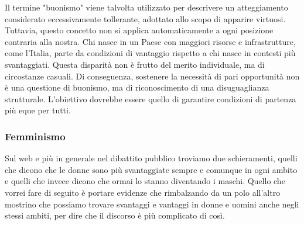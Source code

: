 \documentclass[12pt]{book} %
\begin{document}
\begin{mdframed}[linewidth=1pt]
Il termine "buonismo" viene talvolta utilizzato per descrivere un atteggiamento considerato eccessivamente tollerante, adottato allo scopo di apparire virtuosi. Tuttavia, questo concetto non si applica automaticamente a ogni posizione contraria alla nostra. Chi nasce in un Paese con maggiori risorse e infrastrutture, come l’Italia, parte da condizioni di vantaggio rispetto a chi nasce in contesti più svantaggiati. Questa disparità non è frutto del merito individuale, ma di circostanze casuali. Di conseguenza, sostenere la necessità di pari opportunità non è una questione di buonismo, ma di riconoscimento di una disuguaglianza strutturale. L’obiettivo dovrebbe essere quello di garantire condizioni di partenza più eque per tutti.
\end{mdframed}

\subsubsection{Femminismo}
Sul web e più in generale nel dibattito pubblico troviamo due schieramenti, quelli che dicono che le donne sono
più svantaggiate sempre e comunque in ogni ambito e quelli che invece dicono che ormai lo stanno diventando i maschi. Quello che vorrei fare
di seguito è portare evidenze che rimbalzando da un polo all'altro mostrino che possiamo trovare
svantaggi e vantaggi in donne e uomini anche negli stessi ambiti, per dire che il discorso è più complicato di così. 
\end{document}
